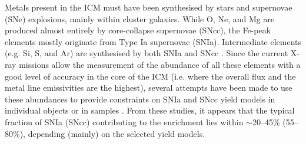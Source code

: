 \documentclass{aa}
\begin{document}
Metals present in the ICM must have been synthesised by stars and supernovae (SNe) explosions, mainly within cluster galaxies. While O, Ne, and Mg are produced almost entirely by core-collapse supernovae (SNcc), the Fe-peak elements mostly originate from Type Ia supernovae (SNIa). Intermediate elements (e.g. Si, S, and Ar) are synthesised by both SNIa and SNcc \citep[for a review, see][]{2013ARA&A..51..457N}. Since the current X-ray missions allow the measurement of the abundance of all these elements with a good level of accuracy in the core of the ICM (i.e. where the overall flux and the metal line emissivities are the highest), several attempts have been made to use these abundances to provide constraints on SNIa and SNcc yield models in individual objects \citep[e.g.][]{2006A&A...449..475W,2006A&A...452..397D,2012ApJ...753...54B} or in samples \citep[e.g.][]{2007A&A...465..345D,2007ApJ...667L..41S,2016A&A...595A.126M}. From these studies, it appears that the typical fraction of SNIa (SNcc) contributing to the enrichment lies within $\sim$20--45\% (55--80\%), depending (mainly) on the selected yield models.
\end{document}
